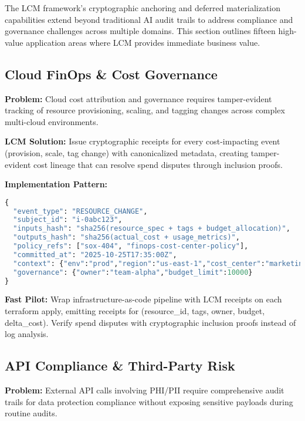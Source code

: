\documentclass[12pt,a4paper]{article}
\begin{document}
The LCM framework's cryptographic anchoring and deferred materialization capabilities extend beyond traditional AI audit trails to address compliance and governance challenges across multiple domains. This section outlines fifteen high-value application areas where LCM provides immediate business value.

\subsection{Cloud FinOps \& Cost Governance}

\textbf{Problem:} Cloud cost attribution and governance requires tamper-evident tracking of resource provisioning, scaling, and tagging changes across complex multi-cloud environments.

\textbf{LCM Solution:} Issue cryptographic receipts for every cost-impacting event (provision, scale, tag change) with canonicalized metadata, creating tamper-evident cost lineage that can resolve spend disputes through inclusion proofs.

\begin{technicalbox}
\textbf{Implementation Pattern:}
\begin{lstlisting}[language=Python, caption=FinOps Receipt Generation]
{
  "event_type": "RESOURCE_CHANGE",
  "subject_id": "i-0abc123",
  "inputs_hash": "sha256(resource_spec + tags + budget_allocation)",
  "outputs_hash": "sha256(actual_cost + usage_metrics)",
  "policy_refs": ["sox-404", "finops-cost-center-policy"],
  "committed_at": "2025-10-25T17:35:00Z",
  "context": {"env":"prod","region":"us-east-1","cost_center":"marketing"},
  "governance": {"owner":"team-alpha","budget_limit":10000}
}
\end{lstlisting}
\end{technicalbox}

\textbf{Fast Pilot:} Wrap infrastructure-as-code pipeline with LCM receipts on each terraform apply, emitting receipts for (resource\_id, tags, owner, budget, delta\_cost). Verify spend disputes with cryptographic inclusion proofs instead of log analysis.

\subsection{API Compliance \& Third-Party Risk}

\textbf{Problem:} External API calls involving PHI/PII require comprehensive audit trails for data protection compliance without exposing sensitive payloads during routine audits.
\end{document}
